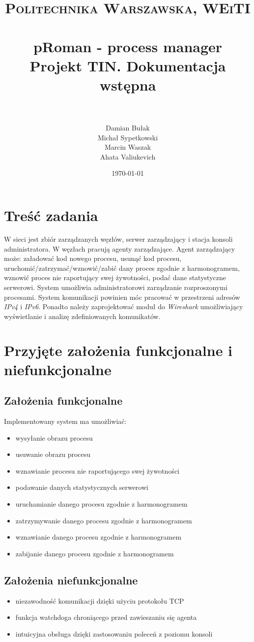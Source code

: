 \documentclass[paper=a4, fontsize=11pt]{scrartcl} %
\title{	
\normalfont \normalsize 
\textsc{Politechnika Warszawska, WEiTI} \\ [25pt] %
\horrule{0.5pt} \\[0.4cm] %
\huge pRoman - process manager \\
\large Projekt TIN. Dokumentacja wstępna
 \\ %
\horrule{2pt} \\[0.5cm] %
}
\author{Damian Bułak\\ Michał Sypetkowski\\ Marcin Waszak\\ Ahata Valiukevich} %
\date{\normalsize\today} %
\begin{document}
\maketitle %


\section*{Treść zadania}

W sieci jest zbiór zarządzanych węzłów, serwer zarządzający i stacja konsoli administratora. W węzłach pracują agenty zarządzające. Agent zarządzający może: załadować kod nowego procesu, usunąć kod procesu, uruchomić/zatrzymać/wznowić/zabić dany proces zgodnie z harmonogramem, wznowić proces nie raportujący swej żywotności, podać dane statystyczne serwerowi. System umożliwia administratorowi zarządzanie rozproszonymi procesami. System komunikacji powinien móc pracować w przestrzeni adresów \textit{IPv4} i \textit{IPv6}. Ponadto należy zaprojektować moduł do \textit{Wireshark} umożliwiający wyświetlanie i analizę zdefiniowanych komunikatów. 


\section*{Przyjęte założenia funkcjonalne i niefunkcjonalne}

\subsection*{Założenia funkcjonalne}
Implementowany system ma umożliwiać: 
\begin{itemize}
\item wysyłanie obrazu procesu
\item usuwanie obrazu procesu
\item wznawianie  procesu nie raportującego swej żywotności 
\item podawanie danych statystycznych serwerowi
\item uruchamianie danego procesu zgodnie z harmonogramem
\item zatrzymywanie danego procesu zgodnie z harmonogramem
\item wznawianie danego procesu zgodnie z harmonogramem
\item zabijanie danego procesu zgodnie z harmonogramem
\end{itemize}

\subsection*{Założenia niefunkcjonalne}
\begin{itemize}
\item niezawodność komunikacji dzięki użyciu protokołu TCP
\item funkcja watchdoga chroniącego przed zawieszaniu się agenta
\item intuicyjna obsługa dzięki zastosowaniu poleceń z poziomu konsoli
\end{itemize}
\end{document}
